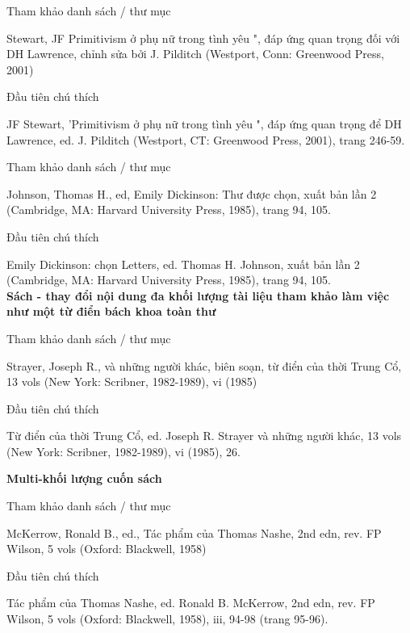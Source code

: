 \documentclass{hcmutarticle}
\begin{document}
Tham khảo danh sách / thư mục

Stewart, JF Primitivism ở phụ nữ trong tình yêu ", đáp ứng quan trọng đối với DH Lawrence, chỉnh sửa bởi J. Pilditch (Westport, Conn: Greenwood Press, 2001)

Đầu tiên chú thích

JF Stewart, 'Primitivism ở phụ nữ trong tình yêu ", đáp ứng quan trọng để DH Lawrence, ed. J. Pilditch (Westport, CT: Greenwood Press, 2001), trang 246-59.

Tham khảo danh sách / thư mục

Johnson, Thomas H., ed, Emily Dickinson: Thư được chọn, xuất bản lần 2 (Cambridge, MA: Harvard University Press, 1985), trang 94, 105.

Đầu tiên chú thích

Emily Dickinson: chọn Letters, ed. Thomas H. Johnson, xuất bản lần 2 (Cambridge, MA: Harvard University Press, 1985), trang 94, 105.\\
{\bfseries Sách - thay đổi nội dung đa khối lượng tài liệu tham khảo làm việc như một từ điển bách khoa toàn thư}

Tham khảo danh sách / thư mục

Strayer, Joseph R., và những người khác, biên soạn, từ điển của thời Trung Cổ, 13 vols (New York: Scribner, 1982-1989), vi (1985)

Đầu tiên chú thích

Từ điển của thời Trung Cổ, ed. Joseph R. Strayer và những người khác, 13 vols (New York: Scribner, 1982-1989), vi (1985), 26.

{\bfseries Multi-khối lượng cuốn sách}

Tham khảo danh sách / thư mục

McKerrow, Ronald B., ed., Tác phẩm của Thomas Nashe, 2nd edn, rev. FP Wilson, 5 vols (Oxford: Blackwell, 1958)

Đầu tiên chú thích

Tác phẩm của Thomas Nashe, ed. Ronald B. McKerrow, 2nd edn, rev. FP Wilson, 5 vols (Oxford: Blackwell, 1958), iii, 94-98 (trang 95-96).
\end{document}
